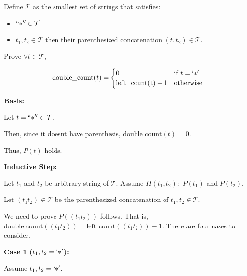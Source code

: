 \documentclass[12pt]{article}
\begin{document}
\begin{enumerate}[a.]
    Define $\mathcal{T}$ as the smallest set of strings that satisfies:

    \begin{itemize}
        \item $``*'' \in \mathcal{T}$
        \item $t_1, t_2 \in \mathcal{T}$ then their parenthesized concatenation $(t_1t_2) \in \mathcal{T}$.
    \end{itemize}

    \bigskip

    Prove $\forall t \in \mathcal{T}$,

    \begin{align*}
        \text{double\_count}(t) =
        \begin{cases}
        0 & \text{if $t = `*'$}\\
        \text{left\_count(t)} - 1 & \text{otherwise}
        \end{cases}
    \end{align*}

    \bigskip

    \underline{\textbf{Basis:}}

    \bigskip

    Let $t = ``*'' \in \mathcal{T}$.

    \bigskip

    Then, since it doesnt have parenthesis, $\text{double\_count}(t) = 0$.

    \bigskip

    Thus, $P(t)$ holds.

    \bigskip

    \underline{\textbf{Inductive Step:}}

    \bigskip

    Let $t_1$ and $t_2$ be arbitrary string of $\mathcal{T}$. Assume $H(t_1,t_2):$
    $P(t_1)$ and $P(t_2)$.

    \bigskip

    Let $(t_1t_2) \in \mathcal{T}$ be the parenthesized concatenation of $t_1,t_2 \in \mathcal{T}$.

    \bigskip

    We need to prove $P((t_1t_2))$ follows. That is, $\text{double\_count}((t_1t_2)) = \text{left\_count}((t_1t_2)) - 1$.
    There are four cases to consider.

    \bigskip

    \textbf{Case 1 ($t_1,t_2 = `*'$):}

    \bigskip

    Assume $t_1,t_2 = `*'$.


\end{enumerate}
\end{document}
